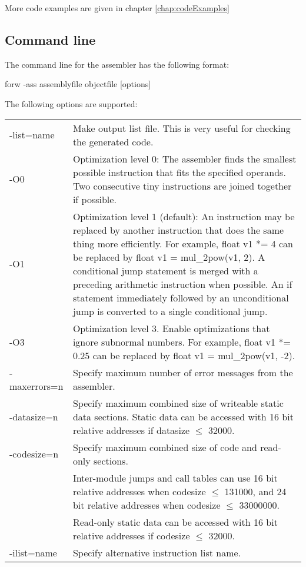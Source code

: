 \documentclass[forwardcom.tex]{subfiles}
\begin{document}
More code examples are given in chapter \ref{chap:codeExamples}
\vspace{2mm}

\subsection{Command line} \label{assemblerCommandLine}
The command line for the assembler has the following format:

\vspace{2mm}
\hspace{5mm} {\ttfamily forw -ass assemblyfile objectfile [options]}

\vspace{2mm}
The following options are supported:\\
\begin{tabular}{|p{22mm}p{140mm}|}
\hline
-list=name & Make output list file. This is very useful for checking the generated code.\\
-O0 & Optimization level 0: The assembler finds the smallest possible instruction that fits the specified operands. Two consecutive tiny instructions are joined together if possible. \\
-O1 & Optimization level 1 (default): An instruction may be replaced by another instruction that does the same thing more efficiently. For example, {\ttfamily float v1 *= 4} can be replaced by
 {\ttfamily float v1 = mul\_2pow(v1, 2)}. 
 A conditional jump statement is merged with a preceding arithmetic instruction when possible.
 An {\ttfamily if} statement immediately followed by an
 unconditional jump is converted to a single conditional jump.\\
-O3 & Optimization level 3. Enable optimizations that ignore subnormal numbers. For example, {\ttfamily float v1 *= 0.25} can be replaced by {\ttfamily float v1 = mul\_2pow(v1, -2)}.\\
-maxerrors=n & Specify maximum number of error messages from the assembler.\\
-datasize=n & Specify maximum combined size of writeable static data sections. Static data can be accessed with 16 bit relative addresses if datasize $\leq$ 32000. \\
-codesize=n & Specify maximum combined size of code and read-only sections. \\
           & Inter-module jumps and call tables can use 16 bit relative addresses when codesize $\leq$ 131000, and 24 bit relative addresses when codesize $\leq$ 33000000. \\
           & Read-only static data can be accessed with 16 bit relative addresses if codesize $\leq$ 32000. \\
-ilist=name & Specify alternative instruction list name.\\
\hline
\end{tabular}
\vspace{2mm}
\end{document}
